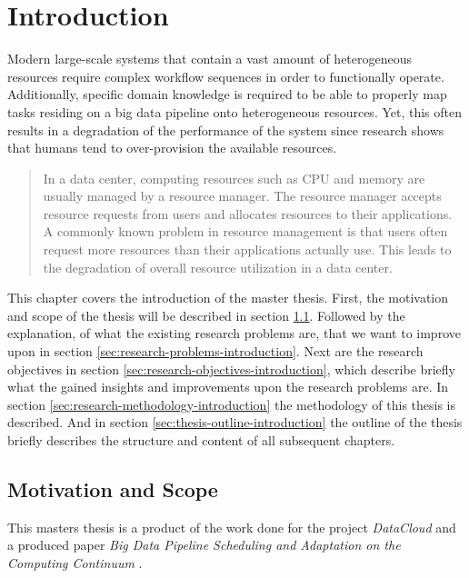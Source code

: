 \chapter{Introduction}
\label{ch:introduction}

    Modern large-scale systems that contain a vast amount of heterogeneous resources require complex workflow sequences in order to functionally operate. Additionally, specific domain knowledge is required to be able to properly map tasks residing on a big data pipeline onto heterogeneous resources. Yet, this often results in a degradation of the performance of the system since research shows that humans tend to over-provision the available resources.

    \begin{quote}
        In a data center, computing resources such as CPU and memory are usually managed by a resource manager. The resource manager accepts resource requests from users and allocates resources to their applications. A commonly known problem in resource management is that users often request more resources than their applications actually use. This leads to the degradation of overall resource utilization in a data center. \cite{thonglekImprovingResourceUtilization2019}
    \end{quote}

    This chapter covers the introduction of the master thesis.
    First, the motivation and scope of the thesis will be described in section \ref{sec:motivation-and-scope-introduction}.
    Followed by the explanation, of what the existing research problems are, that we want to improve upon in section \ref{sec:research-problems-introduction}. Next are the research objectives in section \ref{sec:research-objectives-introduction}, which describe briefly what the gained insights and improvements upon the research problems are. In section \ref{sec:research-methodology-introduction} the methodology of this thesis is described. And in section \ref{sec:thesis-outline-introduction} the outline of the thesis briefly describes the structure and content of all subsequent chapters.

        \section{Motivation and Scope}
        \label{sec:motivation-and-scope-introduction}

            This masters thesis is a product of the work done for the project \emph{DataCloud} and a produced paper \emph{Big Data Pipeline Scheduling and Adaptation on the Computing Continuum} \cite{kimovskiBigDataPipeline2022}.

